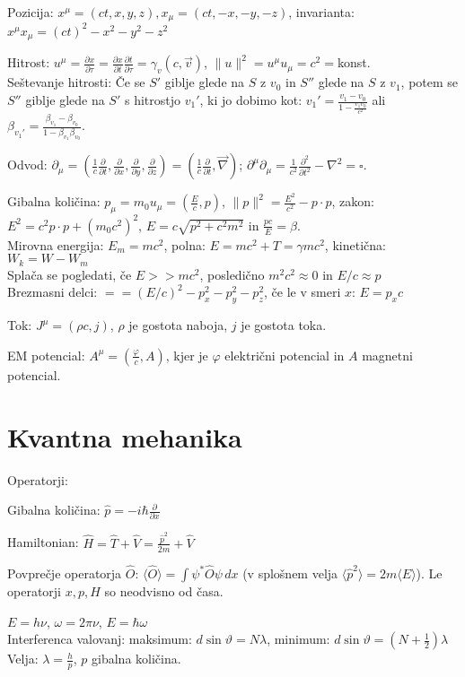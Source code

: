 \documentclass[a4paper, oneside, 12pt]{article}
\theoremstyle{definition}
\newenvironment{itemize*}{\vspace{-10pt}\begin{itemize}\setlength{\itemsep}{0pt}\setlength{\parskip}{2pt}}{\end{itemize}}
\newcommand{\vv}{\vec}
\newcommand{\vnabla}{\ensuremath{\vec{\nabla}}}
\renewcommand{\phi}{\varphi}
\renewcommand{\theta}{\vartheta}
\newcommand{\dd}[2]{\ensuremath{\frac{\partial #1}{\partial #2}}}
\newcommand{\dt}[1][]{\dd{#1}{t}}
\newcommand{\dx}[1][]{\dd{#1}{x}}
\newcommand{\dy}[1][]{\dd{#1}{y}}
\newcommand{\dz}[1][]{\dd{#1}{z}}
\begin{document}
\begin{itemize*}
  \item Pozicija: $x^\mu = (ct, x, y, z), x_\mu = (ct, -x, -y, -z)$,
    invarianta: $x^{\mu} x_{\mu} = (ct)^2 - x^2 - y^2 - z^2$
  \item Hitrost: $u^\mu = \dd{x}{\tau} = \dd{x}{t}\dd{t}{\tau} = \gamma_v(c, \vv{v})$,
                 $\|u\|^2 = u^{\mu} u_{\mu} = c^2 = $konst. \\
                 Seštevanje hitrosti: Če se $S'$ giblje glede na $S$ z $v_0$ in $S''$ glede na $S$ z $v_1$, potem se
                 $S''$ giblje glede na $S'$ s hitrostjo $v_1'$, ki jo dobimo kot:
                 $v_1' = \frac{v_1 -v_0}{1 - \frac{v_1v_0}{c^2}}$ ali
                 $\beta_{v_1'} = \frac{\beta_{v_1} - \beta_{v_0}}{1 - \beta_{v_1}\beta_{v_0}}$.
  \item Odvod: $\partial_\mu = (\frac{1}{c}\dt, \dx, \dy, \dz) = (\frac{1}{c}\dt, \vnabla)$;
        $\partial^\mu\partial_\mu = \frac{1}{c^2}\dd{^2}{t^2}-\nabla^2 = \square$.
  \item Gibalna količina: $p_\mu = m_0u_\mu = (\frac{E}{c}, p)$, $\|p\|^2 = \frac{E^2}{c^2} - p\cdot p$,
        zakon: $E^2 = c^2 p \cdot p + (m_0c^2)^2$, $E = c\sqrt{p^2+c^2m^2}$ in $\frac{p c}{E} = \beta$. \\
        Mirovna energija: $E_m = mc^2$, polna: $E = mc^2 + T= \gamma m c^2$, kinetična: $W_k = W - W_m$\\
        Splača se pogledati, če $E >> mc^2$, posledično $m^2 c^2 \approx 0$ in $E/c \approx p$\\
        Brezmasni delci: $= = (E/c)^2 - p_x^2 - p_y^2 - p_z^2$, če le v smeri $x$: $E = p_x c$
  \item Tok: $J^\mu = (\rho c, j)$, $\rho$ je gostota naboja, $j$ je gostota toka.
  \item EM potencial: $A^\mu = (\frac{\phi}{c}, A)$, kjer je $\phi$ električni potencial in $A$ magnetni potencial.
\end{itemize*}

\section{Kvantna mehanika}
Operatorji:
\begin{itemize*}
    \item Gibalna količina: $\hat{p} = -i\hbar \dx$
    \item Hamiltonian: $\hat{H} = \hat{T} + \hat{V} = \frac{\hat{p}^2}{2m} + \hat{V}$
    \item Povprečje operatorja $\hat O$: $\langle \hat{O} \rangle = \int \psi^*\hat{O}\psi \,dx$ (v splošnem velja $\langle\hat{p}^2\rangle = 2 m \langle E\rangle$). Le operatorji $x, p, H$ so neodvisno od časa.
\end{itemize*}
$E = h \nu$, $\omega = 2 \pi \nu$, $E = \hbar \omega$\\
Interferenca valovanj: maksimum: $d \sin \theta = N \lambda$, minimum:
$d \sin \theta = (N + \frac{1}{2}) \lambda$\\
Velja: $\lambda = \frac{h}{p}$, $p$ gibalna količina.
\end{document}
